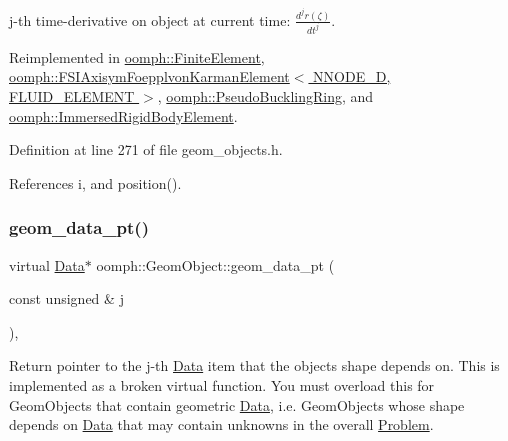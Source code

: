 j-\/th time-\/derivative on object at current time\+: $ \frac{d^{j} r(\zeta)}{dt^j} $. 



Reimplemented in \hyperlink{classoomph_1_1FiniteElement_a1444cb95e415d363c6a7a35332f15730}{oomph\+::\+Finite\+Element}, \hyperlink{classoomph_1_1FSIAxisymFoepplvonKarmanElement_a83bf7fe6d4d9dc08400aa853198c716d}{oomph\+::\+F\+S\+I\+Axisym\+Foepplvon\+Karman\+Element$<$ N\+N\+O\+D\+E\+\_\+D, F\+L\+U\+I\+D\+\_\+\+E\+L\+E\+M\+E\+N\+T $>$}, \hyperlink{classoomph_1_1PseudoBucklingRing_aa11d7bbd2d01a646200e8719e61ad09a}{oomph\+::\+Pseudo\+Buckling\+Ring}, and \hyperlink{classoomph_1_1ImmersedRigidBodyElement_a3b25cfe303aa51f26bd27312abccbba4}{oomph\+::\+Immersed\+Rigid\+Body\+Element}.



Definition at line 271 of file geom\+\_\+objects.\+h.



References i, and position().

\mbox{\label{classoomph_1_1GeomObject_ae1940fc6a3050e645c3882f2f6f3a202}} 
\subsubsection{\texorpdfstring{geom\+\_\+data\+\_\+pt()}{geom\_data\_pt()}}
{\footnotesize\ttfamily virtual \hyperlink{classoomph_1_1Data}{Data}$\ast$ oomph\+::\+Geom\+Object\+::geom\+\_\+data\+\_\+pt (\begin{DoxyParamCaption}\item[{const unsigned \&}]{j }\end{DoxyParamCaption})\hspace{0.3cm}{\ttfamily [inline]}, {\ttfamily [virtual]}}



Return pointer to the j-\/th \hyperlink{classoomph_1_1Data}{Data} item that the object\textquotesingle{}s shape depends on. This is implemented as a broken virtual function. You must overload this for Geom\+Objects that contain geometric \hyperlink{classoomph_1_1Data}{Data}, i.\+e. Geom\+Objects whose shape depends on \hyperlink{classoomph_1_1Data}{Data} that may contain unknowns in the overall \hyperlink{classoomph_1_1Problem}{Problem}. 




